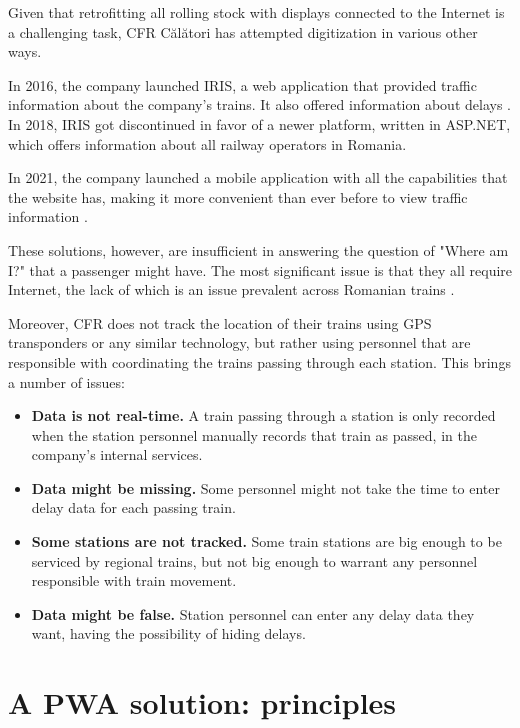 Given that retrofitting all rolling stock with displays connected to the Internet is a challenging task, CFR Călători has attempted digitization in various other ways.

In 2016, the company launched IRIS, a web application that provided traffic information about the company's trains. It also offered information about delays \cite{StiriDeClujLansareCFRIris}. In 2018, IRIS got discontinued in favor of a newer platform, written in ASP.NET, which offers information about all railway operators in Romania.

In 2021, the company launched a mobile application with all the capabilities that the website has, making it more convenient than ever before to view traffic information \cite{MobilissimoCFRLansareMobil}.

These solutions, however, are insufficient in answering the question of "Where am I?" that a passenger might have. The most significant issue is that they all require Internet, the lack of which is an issue prevalent across Romanian trains \cite{CFRInternetIC}.

Moreover, CFR does not track the location of their trains using GPS transponders or any similar technology, but rather using personnel that are responsible with coordinating the trains passing through each station. This brings a number of issues:

\begin{itemize}
    \item \textbf{Data is not real-time.} A train passing through a station is only recorded when the station personnel manually records that train as passed, in the company's internal services.
    \item \textbf{Data might be missing.} Some personnel might not take the time to enter delay data for each passing train.
    \item \textbf{Some stations are not tracked.} Some train stations are big enough to be serviced by regional trains, but not big enough to warrant any personnel responsible with train movement.
    \item \textbf{Data might be false.} Station personnel can enter any delay data they want, having the possibility of hiding delays.
\end{itemize}

\section{A PWA solution: principles}

